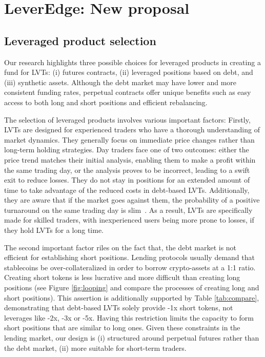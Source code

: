 
\section{LeverEdge: New proposal}\label{sec:proposal}
\subsection{Leveraged product selection}\label{subsec:selection}
Our research highlights three possible choices for leveraged products in creating a fund for LVTs: (i) futures contracts, (ii) leveraged positions based on debt, and (iii) synthetic assets. Although the debt market may have lower and more consistent funding rates, perpetual contracts offer unique benefits such as easy access to both long and short positions and efficient rebalancing.

The selection of leveraged products involves various important factors: Firstly, LVTs are designed for experienced traders who have a thorough understanding of market dynamics. They generally focus on immediate price changes rather than long-term holding strategies. Day traders face one of two outcomes: either the price trend matches their initial analysis, enabling them to make a profit within the same trading day, or the analysis proves to be incorrect, leading to a swift exit to reduce losses. They do not stay in positions for an extended amount of time to take advantage of the reduced costs in debt-based LVTs. Additionally, they are aware that if the market goes against them, the probability of a positive turnaround on the same trading day is slim~\cite{fung2000intraday}. As a result, LVTs are specifically made for skilled traders, with inexperienced users being more prone to losses, if they hold LVTs for a long time. 

The second important factor riles on the fact that, the debt market is not efficient for establishing short positions. Lending protocols usually demand that stablecoins be over-collateralized in order to borrow crypto-assets at a 1:1 ratio. Creating short tokens is less lucrative and more difficult than creating long positions (see Figure \ref{fig:looping} and compare the processes of creating long and short positions). This assertion is additionally supported by Table \ref{tab:compare}, demonstrating that debt-based LVTs solely provide -1x short tokens, not leverages like -2x, -3x or -5x. Having this restriction limits the capacity to form short positions that are similar to long ones. Given these constraints in the lending market, our design is (i) structured around perpetual futures rather than the debt market, (ii) more suitable for short-term traders.

